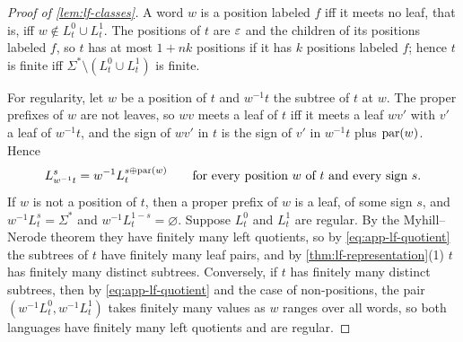 \begin{proof}[Proof of \cref{lem:lf-classes}]
A word $w$ is a position labeled $f$ iff it meets no leaf, that is, iff
$w\notin L^0_t\cup L^1_t$. The positions of $t$ are $\varepsilon$ and the children
of its positions labeled $f$, so $t$ has at most $1+nk$ positions if it has
$k$ positions labeled $f$; hence $t$ is finite iff
$\Sigma^*\setminus(L^0_t\cup L^1_t)$ is finite.

For regularity, let $w$ be a position of $t$ and $w^{-1}t$ the subtree of $t$
at $w$. The proper prefixes of $w$ are not leaves, so $wv$ meets a leaf of $t$
iff it meets a leaf $wv'$ with $v'$ a leaf of $w^{-1}t$, and the sign of
$wv'$ in $t$ is the sign of $v'$ in $w^{-1}t$ plus $\operatorname{par}(w)$. Hence
\begin{equation}\label{eq:app-lf-quotient}
 L^s_{w^{-1}t}=w^{-1}L^{s\oplus\operatorname{par}(w)}_t\qquad
 \text{for every position $w$ of $t$ and every sign $s$.}
\end{equation}
If $w$ is not a position of $t$, then a proper prefix of $w$ is a leaf, of
some sign $s$, and $w^{-1}L^s_t=\Sigma^*$ and $w^{-1}L^{1-s}_t=\varnothing$.
Suppose $L^0_t$ and $L^1_t$ are regular. By the Myhill--Nerode theorem they
have finitely many left quotients, so by \cref{eq:app-lf-quotient} the
subtrees of $t$ have finitely many leaf pairs, and by \cref{thm:lf-representation}(1) $t$ has finitely
many distinct subtrees. Conversely, if $t$ has finitely many distinct
subtrees, then by \cref{eq:app-lf-quotient} and the case of non-positions,
the pair $(w^{-1}L^0_t,w^{-1}L^1_t)$ takes finitely many values as $w$
ranges over all words, so both languages have finitely many left quotients
and are regular.
\end{proof}

